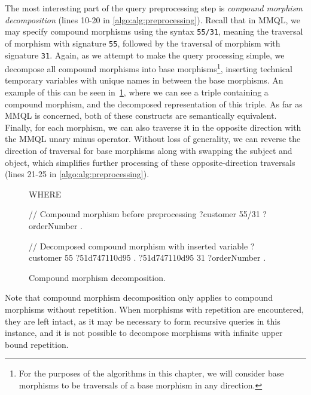 The most interesting part of the query preprocessing step is \textit{compound morphism decomposition} (lines 10-20 in \cref{algo:alg:preprocessing}).
Recall that in MMQL, we may specify compound morphisms using the syntax \texttt{55/31}, meaning the traversal of morphism with signature \texttt{55}, followed by the traversal of morphism with signature \texttt{31}.
Again, as we attempt to make the query processing simple, we decompose all compound morphisms into base morphisms\footnote{For the purposes of the algorithms in this chapter, we will consider base morphisms to be traversals of a base morphism in any direction.}, inserting technical temporary variables with unique names in between the base morphisms.
An example of this can be seen in~\cref{algo:figure:decomposition}, where we can see a triple containing a compound morphism, and the decomposed representation of this triple.
As far as MMQL is concerned, both of these constructs are semantically equivalent.
Finally, for each morphism, we can also traverse it in the opposite direction with the MMQL unary minus operator.
Without loss of generality, we can reverse the direction of traversal for base morphisms along with swapping the subject and object, which simplifies further processing of these opposite-direction traversals (lines 21-25 in \cref{algo:alg:preprocessing}).

\begin{figure}[ht]
\begin{code}
WHERE {
    // Compound morphism before preprocessing
    ?customer 55/31 ?orderNumber .

    // Decomposed compound morphism with inserted variable
    ?customer 55 ?51d747110d95 .
    ?51d747110d95 31 ?orderNumber .
}
\end{code}
\caption{Compound morphism decomposition.}\label{algo:figure:decomposition}
\end{figure}

Note that compound morphism decomposition only applies to compound morphisms without repetition.
When morphisms with repetition are encountered, they are left intact, as it may be necessary to form recursive queries in this instance, and it is not possible to decompose morphisms with infinite upper bound repetition.

